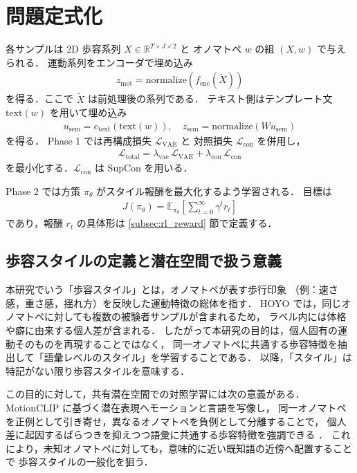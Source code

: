 \section{問題定式化}
\label{sec:formulation}

各サンプルは 2D 歩容系列 $X\in\mathbb{R}^{T\times J\times 2}$ と
オノマトペ $w$ の組 $(X,w)$ で与えられる．
運動系列をエンコーダで埋め込み
\begin{align}
  z_{\mathrm{mot}}=\mathrm{normalize}\!\left(f_{\mathrm{enc}}(\tilde{X})\right)
\end{align}
を得る．ここで $\tilde{X}$ は前処理後の系列である．
テキスト側はテンプレート文 $\mathrm{text}(w)$ を用いて埋め込み
\begin{align}
  u_{\mathrm{sem}} = e_{\mathrm{text}}(\mathrm{text}(w)),\quad
  z_{\mathrm{sem}}=\mathrm{normalize}(W u_{\mathrm{sem}})
\end{align}
を得る．
Phase 1 では再構成損失 $\mathcal{L}_{\mathrm{VAE}}$ と
対照損失 $\mathcal{L}_{\mathrm{con}}$ を併用し，
\begin{align}
  \mathcal{L}_{\mathrm{total}}
  = \lambda_{\mathrm{vae}}\,\mathcal{L}_{\mathrm{VAE}}
  + \lambda_{\mathrm{con}}\,\mathcal{L}_{\mathrm{con}}
\end{align}
を最小化する．$\mathcal{L}_{\mathrm{con}}$ は SupCon を用いる．

Phase 2 では方策 $\pi_\theta$ がスタイル報酬を最大化するよう学習される．
目標は
\begin{align}
  J(\pi_\theta)=\mathbb{E}_{\pi_\theta}\!\left[\sum_{t=0}^{\infty}\gamma^t r_t\right]
\end{align}
であり，報酬 $r_t$ の具体形は \ref{subsec:rl_reward} 節で定義する．

\subsection{歩容スタイルの定義と潜在空間で扱う意義}
\label{subsec:gait_style_definition}

本研究でいう「歩容スタイル」とは，オノマトペが表す歩行印象
（例：速さ感，重さ感，揺れ方）を反映した運動特徴の総体を指す．
HOYO \cite{hoyo} では，同じオノマトペに対しても複数の被験者サンプルが含まれるため，
ラベル内には体格や癖に由来する個人差が含まれる．
したがって本研究の目的は，個人固有の運動そのものを再現することではなく，
同一オノマトペに共通する歩容特徴を抽出して「語彙レベルのスタイル」を学習することである．
以降，「スタイル」は特記がない限り歩容スタイルを意味する．

この目的に対して，共有潜在空間での対照学習には次の意義がある．
MotionCLIP \cite{MotionCLIP} に基づく潜在表現へモーションと言語を写像し，
同一オノマトペを正例として引き寄せ，異なるオノマトペを負例として分離することで，
個人差に起因するばらつきを抑えつつ語彙に共通する歩容特徴を強調できる \cite{supcon}．
これにより，未知オノマトペに対しても，意味的に近い既知語の近傍へ配置することで
歩容スタイルの一般化を狙う．

